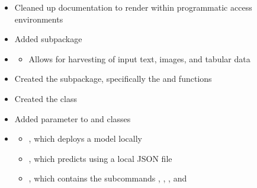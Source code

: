 \documentclass[letterpaper,10pt,english]{sphinxmanual}
\begin{document}
\begin{itemize}
\begin{description}
\begin{itemize}
\item {} 
\sphinxAtStartPar
Cleaned up documentation to render within programmatic access environments

\item {} 
\sphinxAtStartPar
Added  subpackage

\item {} \begin{description}
\begin{itemize}
\item {} 
\sphinxAtStartPar
Allows for harvesting of input text, images, and tabular data

\end{itemize}

\end{description}

\item {} 
\sphinxAtStartPar
Created the  subpackage, specifically the  and  functions

\item {} 
\sphinxAtStartPar
Created the  class

\item {} 
\sphinxAtStartPar
Added  parameter to  and  classes

\item {} \begin{description}
\begin{itemize}
\item {} 
\sphinxAtStartPar
{}, which deploys a model locally

\item {} 
\sphinxAtStartPar
{}, which predicts using a local JSON file

\item {} 
\sphinxAtStartPar
{}, which contains the subcommands , , , and 

\end{itemize}


\end{description}
\end{itemize}
\end{description}
\end{itemize}
\end{document}
